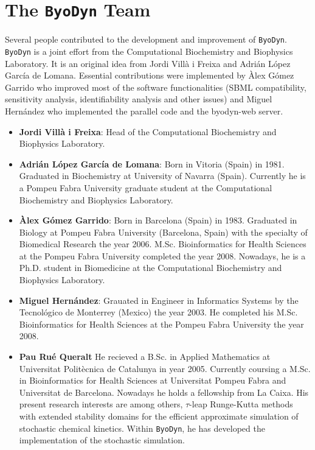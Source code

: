 \documentclass[a4paper, 11pt]{article}
\begin{document}
\section{The \texttt{ByoDyn} Team}
Several people contributed to the development and improvement of \texttt{ByoDyn}.
\texttt{ByoDyn} is a joint effort from the Computational Biochemistry and Biophysics Laboratory.
It is an original idea from Jordi Vill\`a i Freixa and Adri\'an L\'opez Garc\'ia de Lomana.
Essential contributions were implemented by \`Alex G\'omez Garrido who improved
most of the software functionalities (SBML compatibility, sensitivity analysis,
identifiability analysis and other issues) and Miguel Hern\'andez who
implemented the parallel code and the byodyn-web server.
\begin{itemize}
\item
  \textbf{Jordi Vill\`a i Freixa}:
  Head of the Computational Biochemistry and Biophysics Laboratory.
\item
  \textbf{Adri\'an L\'opez Garc\'ia de Lomana}:
  Born in Vitoria (Spain) in 1981.
  Graduated in Biochemistry at University of Navarra (Spain).
  Currently he is a Pompeu Fabra University graduate student at the Computational Biochemistry and Biophysics Laboratory.
\item
  \textbf{\`Alex G\'omez Garrido}:
  Born in Barcelona (Spain) in 1983.
  Graduated in Biology at Pompeu Fabra University (Barcelona, Spain) with the specialty of Biomedical Research the year 2006.
  M.Sc. Bioinformatics for Health Sciences at the Pompeu Fabra University completed the year 2008.
  Nowadays, he is a Ph.D. student in Biomedicine at the Computational Biochemistry and Biophysics Laboratory.  
\item
  \textbf{Miguel Hern\'andez}:
  Grauated in Engineer in Informatics Systems by the Tecnol\'ogico de Monterrey (Mexico) the year 2003.
  He completed his M.Sc. Bioinformatics for Health Sciences at the Pompeu Fabra University the year 2008. 
\item 
  \textbf{Pau Ru\'e Queralt}
  He recieved a B.Sc. in Applied Mathematics at Universitat Polit\`ecnica de Catalunya in year 2005. 
  Currently coursing a M.Sc. in Bioinformatics for Health Sciences at Universitat Pompeu Fabra and Universitat de Barcelona.
  Nowadays he holds a fellowship from La Caixa.
  His present research interests are among others, $\tau$-leap Runge-Kutta methods with extended stability domains for the efficient approximate simulation of stochastic chemical kinetics.
  Within \texttt{ByoDyn}, he has developed the implementation of the stochastic simulation.
\end{itemize}
\end{document}
